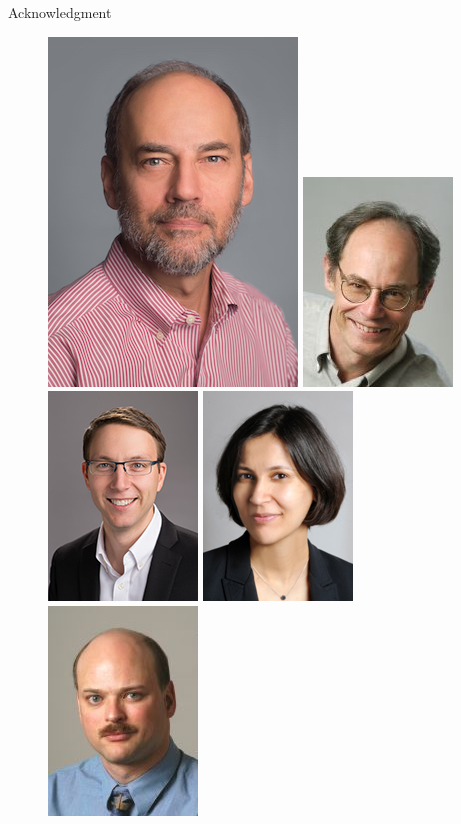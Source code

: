 \begin{frame}{Acknowledgment}

  \begin{figure}
    \includegraphics[width=0.15\linewidth]{figures/lee.jpg}
    \pause
    \hfill
    \includegraphics[width=0.15\linewidth]{figures/wawrzynek.jpg}
    \hfill
    \includegraphics[width=0.15\linewidth]{figures/hartmann.jpg}
    \hfill
    \includegraphics[width=0.15\linewidth]{figures/ratnasamy.jpg}
    \hfill
    \includegraphics[width=0.15\linewidth]{figures/kubiatowicz.jpg}
    \hfill
  \end{figure}


\end{frame}
